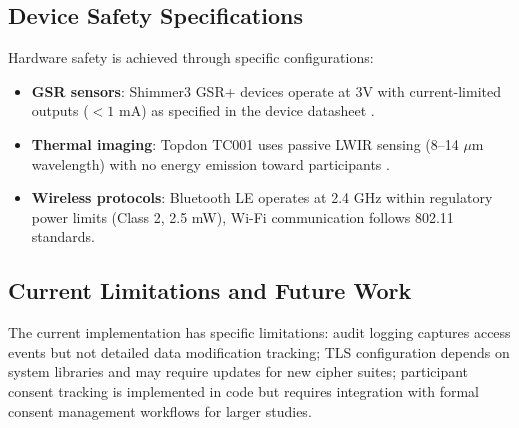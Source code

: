 \subsection{Device Safety Specifications}
Hardware safety is achieved through specific configurations:
\begin{itemize}
    \item \textbf{GSR sensors}: Shimmer3 GSR+ devices operate at 3V with current-limited outputs ($<1$ mA) as specified in the device datasheet \citep{ref8}.
    \item \textbf{Thermal imaging}: Topdon TC001 uses passive LWIR sensing (8--14 $\mu$m wavelength) with no energy emission toward participants \citep{ref16}.
    \item \textbf{Wireless protocols}: Bluetooth LE operates at 2.4 GHz within regulatory power limits (Class 2, 2.5 mW), Wi-Fi communication follows 802.11 standards.
\end{itemize}

\subsection{Current Limitations and Future Work}
The current implementation has specific limitations: audit logging captures access events but not detailed data modification tracking; TLS configuration depends on system libraries and may require updates for new cipher suites; participant consent tracking is implemented in code but requires integration with formal consent management workflows for larger studies.
